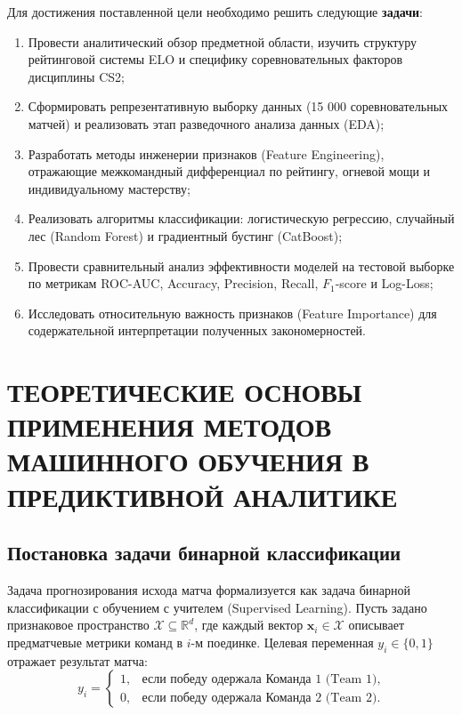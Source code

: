 \documentclass[14pt, a4paper]{extarticle}
\begin{document}
Для достижения поставленной цели необходимо решить следующие \textbf{задачи}:
\begin{enumerate}
    \item Провести аналитический обзор предметной области, изучить структуру рейтинговой системы ELO и специфику соревновательных факторов дисциплины CS2;
    \item Сформировать репрезентативную выборку данных (15 000 соревновательных матчей) и реализовать этап разведочного анализа данных (EDA);
    \item Разработать методы инженерии признаков (Feature Engineering), отражающие межкомандный дифференциал по рейтингу, огневой мощи и индивидуальному мастерству;
    \item Реализовать алгоритмы классификации: логистическую регрессию, случайный лес (Random Forest) и градиентный бустинг (CatBoost);
    \item Провести сравнительный анализ эффективности моделей на тестовой выборке по метрикам ROC-AUC, Accuracy, Precision, Recall, $F_1$-score и Log-Loss;
    \item Исследовать относительную важность признаков (Feature Importance) для содержательной интерпретации полученных закономерностей.
\end{enumerate}

\newpage

\section{ТЕОРЕТИЧЕСКИЕ ОСНОВЫ ПРИМЕНЕНИЯ МЕТОДОВ МАШИННОГО ОБУЧЕНИЯ В ПРЕДИКТИВНОЙ АНАЛИТИКЕ}

\subsection{Постановка задачи бинарной классификации}

Задача прогнозирования исхода матча формализуется как задача бинарной классификации с обучением с учителем (Supervised Learning). Пусть задано признаковое пространство $\mathcal{X} \subseteq \mathbb{R}^d$, где каждый вектор $\mathbf{x}_i \in \mathcal{X}$ описывает предматчевые метрики команд в $i$-м поединке. Целевая переменная $y_i \in \{0, 1\}$ отражает результат матча:
\begin{equation}
y_i = \begin{cases} 
1, & \text{если победу одержала Команда 1 (Team 1)}, \\
0, & \text{если победу одержала Команда 2 (Team 2)}.
\end{cases}
\end{equation}
\end{document}
